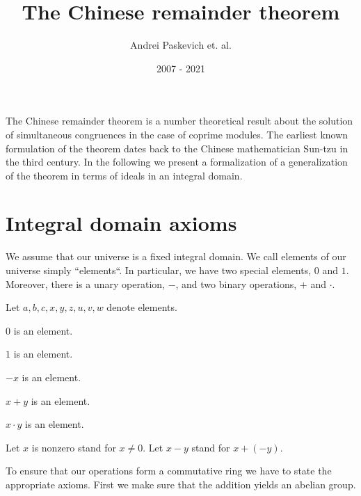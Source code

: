 \documentclass{article}
\title{The Chinese remainder theorem}
\author{Andrei Paskevich et. al.}
\date{2007 - 2021}
\begin{document}
  \maketitle

  The Chinese remainder theorem is a number theoretical result about the solution of simultaneous congruences in the case of coprime modules. The earliest known formulation of the theorem dates back to the Chinese mathematician Sun-tzu in the third century. In the following we present a formalization of a generalization of the theorem in terms of ideals in an integral domain.


  \section{Integral domain axioms}

  We assume that our universe is a fixed integral domain. We call elements of our universe simply ``elements``. In particular, we have two special elements, $0$ and $1$. Moreover, there is a unary operation, $-$, and two binary operations, $+$ and $\cdot$.

  \begin{forthel}

    Let $a,b,c,x,y,z,u,v,w$ denote elements.

    \begin{signature}[SortsC]
      $0$ is an element.
    \end{signature}

    \begin{signature}[SortsC]
      $1$ is an element.
    \end{signature}

    \begin{signature}[Sortsu]
      $-x$ is an element.
    \end{signature}

    \begin{signature}[SortsB]
      $x + y$ is an element.
    \end{signature}

    \begin{signature}[SortsB]
      $x \cdot y$ is an element.
    \end{signature}

    Let $x$ is nonzero stand for $x \neq 0$.
    Let $x - y$ stand for $x + (-y)$.
  \end{forthel}

  To ensure that our operations form a commutative ring we have to state the appropriate axioms. First we make sure that the addition yields an abelian group.
\end{document}
